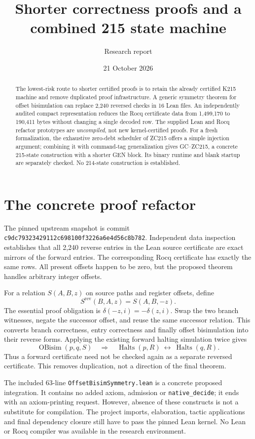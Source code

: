 \documentclass[11pt]{article}
\title{Shorter correctness proofs and a combined 215 state machine}
\author{Research report}\date{21 October 2026}
\begin{document}
\maketitle
\begin{abstract}
The lowest-risk route to shorter certified proofs is to retain the already certified K215 machine and remove duplicated proof infrastructure. A generic symmetry theorem for offset bisimulation can replace 2,240 reversed checks in 16 Lean files. An independently audited compact representation reduces the Rocq certificate data from 1,499,170 to 190,411 bytes without changing a single decoded row. The supplied Lean and Rocq refactor prototypes are \emph{uncompiled}, not new kernel-certified proofs. For a fresh formalization, the exhaustive zero-debt scheduler of ZC215 offers a simple injection argument; combining it with command-tag generalization gives GC--ZC215, a concrete 215-state construction with a shorter GEN block. Its binary runtime and blank startup are separately checked. No 214-state construction is established.
\end{abstract}

\section{The concrete proof refactor}
The pinned upstream snapshot is commit \texttt{c9dc79323429112c698100f3226a6e4d56c8b782}. Independent data inspection establishes that all 2,240 reverse entries in the Lean source certificate are exact mirrors of the forward entries. The corresponding Rocq certificate has exactly the same rows. All present offsets happen to be zero, but the proposed theorem handles arbitrary integer offsets.

For a relation $S(A,B,z)$ on source paths and register offsets, define
\[
 S^{\mathrm{rev}}(B,A,z)=S(A,B,-z).
\]
The essential proof obligation is $\delta(-z,i)=-\delta(z,i)$. Swap the two branch witnesses, negate the successor offset, and reuse the same successor relation. This converts branch correctness, entry correctness and finally offset bisimulation into their reverse forms. Applying the existing forward halting simulation twice gives
\[
 \operatorname{OBisim}(p,q,S)\quad\Longrightarrow\quad
 \operatorname{Halts}(p,R)\ \longleftrightarrow\ \operatorname{Halts}(q,R).
\]
Thus a forward certificate need not be checked again as a separate reversed certificate. This removes duplication, not a direction of the final theorem.

The included 63-line \texttt{OffsetBisimSymmetry.lean} is a concrete proposed integration. It contains no added axiom, admission or \texttt{native\_decide}; it ends with an axiom-printing request. However, absence of these constructs is not a substitute for compilation. The project imports, elaboration, tactic applications and final dependency closure still have to pass the pinned Lean kernel. No Lean or Rocq compiler was available in the research environment.
\end{document}
